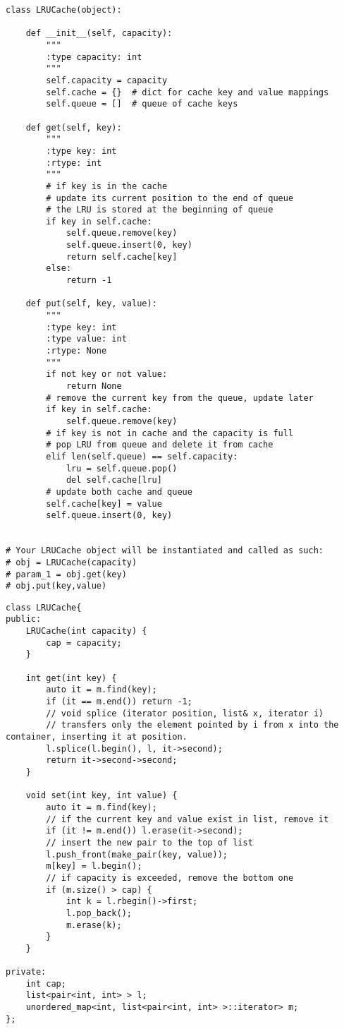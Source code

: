 \begin{lstlisting}
class LRUCache(object):

    def __init__(self, capacity):
        """
        :type capacity: int
        """
        self.capacity = capacity
        self.cache = {}  # dict for cache key and value mappings
        self.queue = []  # queue of cache keys
        
    def get(self, key):
        """
        :type key: int
        :rtype: int
        """
        # if key is in the cache
        # update its current position to the end of queue
        # the LRU is stored at the beginning of queue
        if key in self.cache:
            self.queue.remove(key)
            self.queue.insert(0, key)
            return self.cache[key]
        else:
            return -1

    def put(self, key, value):
        """
        :type key: int
        :type value: int
        :rtype: None
        """
        if not key or not value: 
            return None
        # remove the current key from the queue, update later
        if key in self.cache:
            self.queue.remove(key)
        # if key is not in cache and the capacity is full
        # pop LRU from queue and delete it from cache
        elif len(self.queue) == self.capacity:
            lru = self.queue.pop()
            del self.cache[lru]
        # update both cache and queue
        self.cache[key] = value
        self.queue.insert(0, key)


# Your LRUCache object will be instantiated and called as such:
# obj = LRUCache(capacity)
# param_1 = obj.get(key)
# obj.put(key,value)
\end{lstlisting}

\begin{lstlisting}
class LRUCache{
public:
    LRUCache(int capacity) {
        cap = capacity;
    }
    
    int get(int key) {
        auto it = m.find(key);
        if (it == m.end()) return -1;
        // void splice (iterator position, list& x, iterator i)
        // transfers only the element pointed by i from x into the container, inserting it at position.
        l.splice(l.begin(), l, it->second);
        return it->second->second;
    }
    
    void set(int key, int value) {
        auto it = m.find(key);
        // if the current key and value exist in list, remove it
        if (it != m.end()) l.erase(it->second);
        // insert the new pair to the top of list
        l.push_front(make_pair(key, value)); 
        m[key] = l.begin();
        // if capacity is exceeded, remove the bottom one
        if (m.size() > cap) {
            int k = l.rbegin()->first;
            l.pop_back();
            m.erase(k);
        }
    }
    
private:
    int cap;
    list<pair<int, int> > l;
    unordered_map<int, list<pair<int, int> >::iterator> m;
};
\end{lstlisting}


